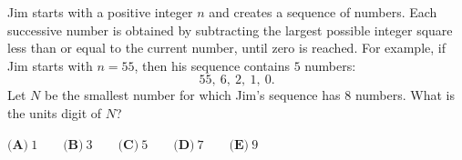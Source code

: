 Jim starts with a positive integer $n$ and creates a sequence of numbers. Each successive number is obtained by subtracting the largest possible integer square less than or equal to the current number, until zero is reached. For example, if Jim starts with $n=55$, then his sequence contains $5$ numbers:
\[
55,\ 6,\ 2,\ 1,\ 0 .
\]
Let $N$ be the smallest number for which Jim's sequence has $8$ numbers. What is the units digit of $N$?

$\textbf{(A)}\ 1\qquad\textbf{(B)}\ 3\qquad\textbf{(C)}\ 5\qquad\textbf{(D)}\ 7\qquad\textbf{(E)}\ 9$
